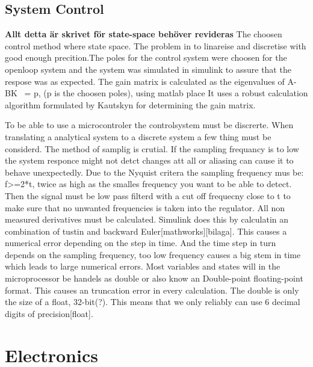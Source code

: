 \documentclass[a4paper,11pt]{kth-mag}
\begin{document}
%
%

\subsection{System Control}
\textbf{Allt detta är skrivet för state-space behöver revideras}
The choosen control method where state space. The problem in to linareise and discretise with good enough precition.The poles for the control system were choosen for the openloop system and the system was simulated in 
	simulink to assure that the respose was as expected. 
	The gain matrix is calculated as the eigenvalues of A-BK ~= p, (p is the choosen poles), using matlab place
	It uses a robust calculation algorithm formulated by Kautskyn for determining the gain matrix.


To be able to use a microcontroler the controlsystem must be discrerte. When translating a analytical system to a 
discrete system a few thing must be considerd. The method of samplig is crutial. If the sampling frequancy is to 
low the system responce might not detct changes att all or aliasing can cause it to behave unexpectedly. Due to the 
Nyquist critera the sampling frequency mus be: f>=2*t, twice as high as the smalles frequency you want to be able to
detect. Then the signal must be low pass filterd with a cut off frequecny close to t to make sure that no unwanted
frequencies is taken into the regulator.
All non measured derivatives must be calculated. Simulink does this by calculatin an combination of tustin and 
backward Euler[mathworks][bilaga]. This causes a numerical error depending on the step in time. And the time step
in turn depends on the sampling frequency, too low frequency causes a big stem in time which leads to large numerical 
errors.
Most variables and states will in the microprocessor be handels as double or also know an Double-point floating-point
format. This causes an truncation error in every calculation. The double is only the size of a float, 32-bit(?). This
means that we only reliably can use 6 decimal digits of precision[float].

\section{Electronics}
\end{document}
